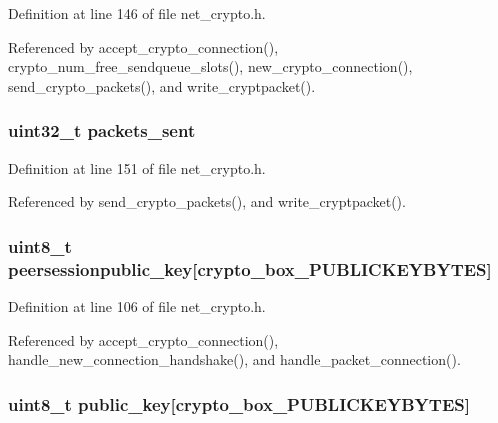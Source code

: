Definition at line 146 of file net\+\_\+crypto.\+h.



Referenced by accept\+\_\+crypto\+\_\+connection(), crypto\+\_\+num\+\_\+free\+\_\+sendqueue\+\_\+slots(), new\+\_\+crypto\+\_\+connection(), send\+\_\+crypto\+\_\+packets(), and write\+\_\+cryptpacket().

\hypertarget{struct_crypto___connection_ad51d37ac38989c1d089da8aa0d1bc1d7}{
\subsubsection[{packets\+\_\+sent}]{\setlength{\rightskip}{0pt plus 5cm}uint32\+\_\+t packets\+\_\+sent}}\label{struct_crypto___connection_ad51d37ac38989c1d089da8aa0d1bc1d7}


Definition at line 151 of file net\+\_\+crypto.\+h.



Referenced by send\+\_\+crypto\+\_\+packets(), and write\+\_\+cryptpacket().

\hypertarget{struct_crypto___connection_ac040d4ba2a22ee327952009e7396bb2f}{
\subsubsection[{peersessionpublic\+\_\+key}]{\setlength{\rightskip}{0pt plus 5cm}uint8\+\_\+t peersessionpublic\+\_\+key\mbox{[}crypto\+\_\+box\+\_\+\+P\+U\+B\+L\+I\+C\+K\+E\+Y\+B\+Y\+T\+E\+S\mbox{]}}}\label{struct_crypto___connection_ac040d4ba2a22ee327952009e7396bb2f}


Definition at line 106 of file net\+\_\+crypto.\+h.



Referenced by accept\+\_\+crypto\+\_\+connection(), handle\+\_\+new\+\_\+connection\+\_\+handshake(), and handle\+\_\+packet\+\_\+connection().

\hypertarget{struct_crypto___connection_aaa806bb1136fb3d4b5d8d8970b596ff7}{
\subsubsection[{public\+\_\+key}]{\setlength{\rightskip}{0pt plus 5cm}uint8\+\_\+t public\+\_\+key\mbox{[}crypto\+\_\+box\+\_\+\+P\+U\+B\+L\+I\+C\+K\+E\+Y\+B\+Y\+T\+E\+S\mbox{]}}}\label{struct_crypto___connection_aaa806bb1136fb3d4b5d8d8970b596ff7}



